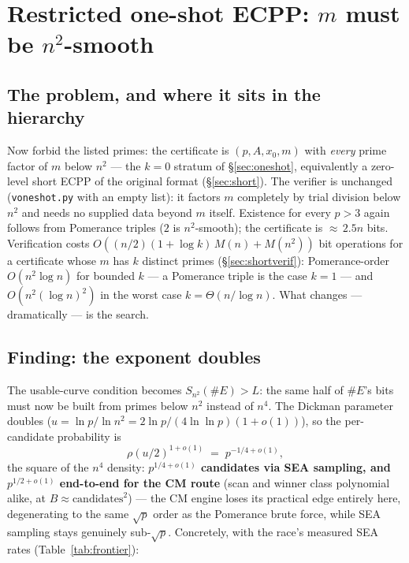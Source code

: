 \documentclass[11pt]{amsart}
\newcommand{\smoothpart}[2]{S_{#1}(#2)}
\theoremstyle{plain}
\theoremstyle{definition}
\theoremstyle{remark}
\begin{document}
\section{Restricted one-shot ECPP: \texorpdfstring{$m$ must be $n^2$-smooth}{m must be n\string^2-smooth}}\label{sec:restricted}

\subsection{The problem, and where it sits in the hierarchy}

Now forbid the listed primes: the certificate is $(p, A, x_0, m)$ with \emph{every} prime factor of $m$
below $n^2$ --- the $k = 0$ stratum of \S\ref{sec:oneshot}, equivalently a zero-level short ECPP of
the original format
(\S\ref{sec:short}).  The verifier is unchanged (\texttt{voneshot.py} with an empty list): it factors
$m$ completely by trial division below $n^2$ and needs no supplied data beyond $m$ itself.  Existence
for every $p > 3$ again follows from Pomerance triples ($2$ is $n^2$-smooth); the certificate is
${\approx}\,2.5n$ bits.  Verification costs $O((n/2)(1+\log k)\,M(n) + M(n^2))$ bit operations for a
certificate whose $m$ has $k$ distinct primes (\S\ref{sec:shortverif}): Pomerance-order $O(n^2\log n)$
for bounded $k$ --- a Pomerance triple is the case $k = 1$ --- and $O(n^2(\log n)^2)$ in the worst case
$k = \Theta(n/\log n)$.  What changes --- dramatically --- is the search.

\subsection{Finding: the exponent doubles}\label{sec:restrictedfind}

The usable-curve condition becomes $\smoothpart{n^2}{\#E} > L$: the same half of $\#E$'s bits must now
be built from primes below $n^2$ instead of $n^4$.  The Dickman parameter doubles
($u = \ln p/\ln n^2 = 2\ln p/(4\ln\ln p)(1+o(1))$), so the per-candidate probability is
\[
  \rho(u/2)^{1+o(1)} \;=\; p^{-1/4+o(1)},
\]
the square of the $n^4$ density: \textbf{$p^{1/4+o(1)}$ candidates via SEA sampling, and
$p^{1/2+o(1)}$ end-to-end for the CM route} (scan and winner class polynomial alike, at
$B \approx \text{candidates}^2$) --- the CM
engine loses its practical edge entirely here, degenerating to the same $\sqrt p$ order as the
Pomerance brute force, while SEA sampling stays genuinely sub-$\sqrt p$.  Concretely, with the race's
measured SEA rates (Table~\ref{tab:frontier}):
\end{document}
